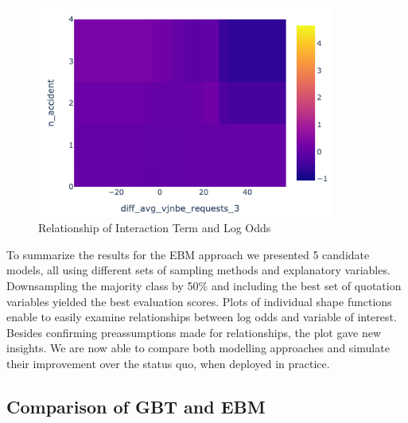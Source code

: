 \documentclass[12pt,titlepage]{article}
\begin{document}
\begin{figure}[H]
    \centerline{\includegraphics[height=7cm]{shape_2dim.png}}
    \caption{Relationship of Interaction Term and Log Odds}
    \label{fig:shape2dim}
\end{figure}
\noindent
To summarize the results for the EBM approach we presented 5 candidate models, all using different sets of sampling methods and explanatory variables. Downsampling the majority class by 50\% and including the best set of quotation variables yielded the best evaluation scores. Plots of individual shape functions enable to easily examine relationships between log odds and variable of interest. Besides confirming preassumptions made for relationships, the plot gave new insights. We are now able to compare both modelling approaches and simulate their improvement over the status quo, when deployed in practice. \\

\subsection{Comparison of GBT and EBM}
\end{document}
